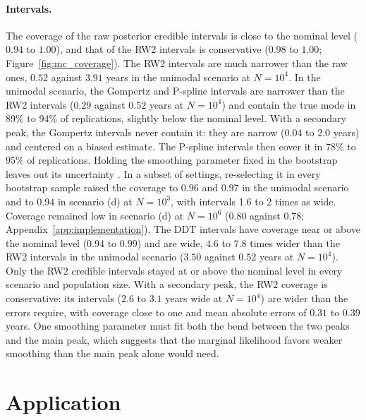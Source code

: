 \documentclass[12pt, letterpaper]{article}
\begin{document}
\paragraph{Intervals.} The coverage of the raw posterior credible intervals is close to the nominal level ($0.94$ to $1.00$), and that of the RW2 intervals is conservative ($0.98$ to $1.00$; Figure~\ref{fig:mc_coverage}). The RW2 intervals are much narrower than the raw ones, $0.52$ against $3.91$ years in the unimodal scenario at $N = 10^4$. In the unimodal scenario, the Gompertz and P-spline intervals are narrower than the RW2 intervals ($0.29$ against $0.52$ years at $N = 10^4$) and contain the true mode in $89\%$ to $94\%$ of replications, slightly below the nominal level. With a secondary peak, the Gompertz intervals never contain it: they are narrow ($0.04$ to $2.0$ years) and centered on a biased estimate. The P-spline intervals then cover it in $78\%$ to $95\%$ of replications. Holding the smoothing parameter fixed in the bootstrap leaves out its uncertainty \citep{wood2016smoothing}. In a subset of settings, re-selecting it in every bootstrap sample raised the coverage to $0.96$ and $0.97$ in the unimodal scenario and to $0.94$ in scenario (d) at $N = 10^3$, with intervals 1.6 to 2 times as wide. Coverage remained low in scenario (d) at $N = 10^6$ ($0.80$ against $0.78$; Appendix~\ref{app:implementation}). The DDT intervals have coverage near or above the nominal level ($0.94$ to $0.99$) and are wide, $4.6$ to $7.8$ times wider than the RW2 intervals in the unimodal scenario ($3.50$ against $0.52$ years at $N = 10^4$). Only the RW2 credible intervals stayed at or above the nominal level in every scenario and population size. With a secondary peak, the RW2 coverage is conservative: its intervals ($2.6$ to $3.1$ years wide at $N = 10^4$) are wider than the errors require, with coverage close to one and mean absolute errors of $0.31$ to $0.39$ years. One smoothing parameter must fit both the bend between the two peaks and the main peak, which suggests that the marginal likelihood favors weaker smoothing than the main peak alone would need.

\section{Application}
\label{sec:application}
\end{document}
